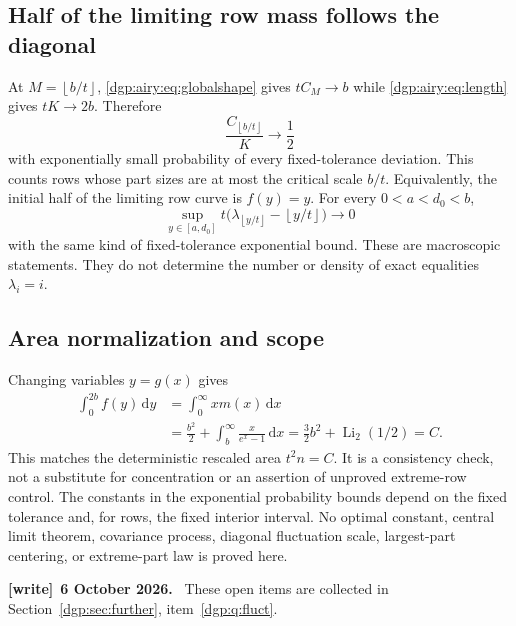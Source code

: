 \documentclass[11pt,letterpaper]{article}
\numberwithin{equation}{section}
\theoremstyle{remark}\newtheorem{remark}[theorem]{Remark}
\newcommand{\floor}[1]{\left\lfloor #1\right\rfloor}
\newcommand{\dd}{\,\mathrm d}
\newenvironment{writenote}[1][]{\par\smallskip\begingroup\small
 \noindent\textbf{[write]}\if\relax\detokenize{#1}\relax\else~\textbf{#1.}\fi\ }%
 {\par\endgroup\smallskip}
\begin{document}
\subsection{Half of the limiting row mass follows the diagonal}
At $M=\floor{b/t}$, \eqref{dgp:airy:eq:globalshape} gives $tC_M\to b$ while
\eqref{dgp:airy:eq:length} gives $tK\to2b$. Therefore
\begin{equation}\label{dgp:airy:eq:halfmass}
 \frac{C_{\floor{b/t}}}{K}\longrightarrow\frac12
\end{equation}
with exponentially small probability of every fixed-tolerance
deviation. This counts rows whose part sizes are at most the critical
scale $b/t$. Equivalently, the initial half of the limiting row curve
is $f(y)=y$. For every $0<a<d_0<b$,
\[
 \sup_{y\in[a,d_0]}t\bigl(\lambda_{\floor{y/t}}-\floor{y/t}\bigr)
 \longrightarrow0
\]
with the same kind of fixed-tolerance exponential bound.
These are macroscopic statements. They do not determine the number
or density of exact equalities $\lambda_i=i$.

\subsection{Area normalization and scope}
Changing variables $y=g(x)$ gives
\begin{align*}
 \int_0^{2b}f(y)\dd y
 &=\int_0^\infty x m(x)\dd x\\
 &=\frac{b^2}2+\int_b^\infty\frac{x}{e^x-1}\dd x
 =\frac32b^2+\operatorname{Li}_2(1/2)=C.
\end{align*}
This matches the deterministic rescaled area $t^2n=C$.
It is a consistency check, not a substitute for concentration or an
assertion of unproved extreme-row control.
The constants in the exponential probability bounds depend on the
fixed tolerance and, for rows, the fixed interior interval.
No optimal constant, central limit theorem, covariance process,
diagonal fluctuation scale, largest-part centering, or extreme-part
law is proved here.
\begin{writenote}[6 October 2026]
These open items are collected in Section~\ref{dgp:sec:further}, item~\ref{dgp:q:fluct}.
\end{writenote}
\end{document}
